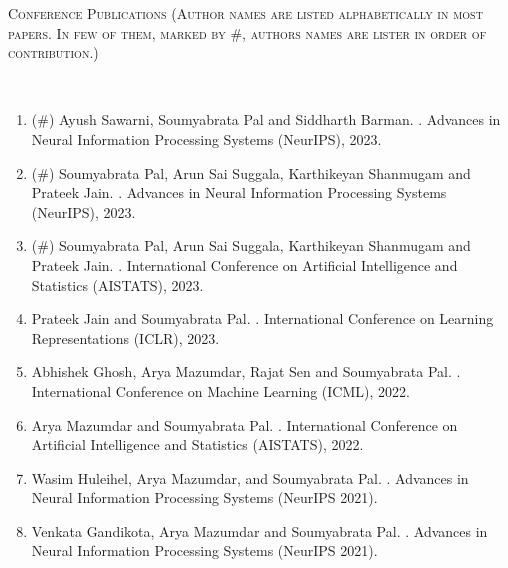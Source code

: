 \documentclass[9pt]{article}
\newenvironment{changemargin}[2]{%
  \begin{list}{}{%
    \setlength{\topsep}{0pt}%
    \setlength{\leftmargin}{0pt}%
    \setlength{\rightmargin}{#2}%
    \setlength{\listparindent}{\parindent}%
    \setlength{\itemindent}{\parindent}%
    \setlength{\parsep}{\parskip}%
  }%
  \item[]}{\end{list}
}
\newcommand{\lineover}{
	\begin{changemargin}{-0.05in}{-0.05in}
		\vspace*{-8pt}
		\hrulefill \\
		\vspace*{-2pt}
	\end{changemargin}
}
\newcommand{\header}[1]{
	\begin{changemargin}{-0.5in}{-0.5in}
		\scshape{#1}\\
  	\lineover
	\end{changemargin}
}
\begin{document}
\header{Conference Publications (Author names are listed alphabetically in most papers. In few of them, marked by \#, authors names are lister in order of contribution.)}
\begin{enumerate}

\item (\#) Ayush Sawarni, Soumyabrata Pal and Siddharth Barman. \href{}{}.
Advances in Neural Information Processing Systems (NeurIPS), 2023. 

\item (\#) Soumyabrata Pal, Arun Sai Suggala, Karthikeyan Shanmugam and Prateek Jain.
\href{}{}.
Advances in Neural Information Processing Systems (NeurIPS), 2023.


\item (\#)  Soumyabrata Pal, Arun Sai Suggala, Karthikeyan Shanmugam and Prateek Jain.
\href{https://arxiv.org/abs/2301.07040}{}.
International Conference on Artificial Intelligence and Statistics (AISTATS), 2023.

\item  Prateek Jain and Soumyabrata Pal.
\href{https://arxiv.org/abs/2209.03997}{}.
International Conference on Learning Representations (ICLR), 2023.

\item  Abhishek Ghosh, Arya Mazumdar, Rajat Sen and Soumyabrata Pal.
\href{https://arxiv.org/abs/2205.13166}{}. International Conference on Machine Learning (ICML), 2022.

\item Arya Mazumdar and Soumyabrata Pal. \href{https://arxiv.org/abs/2202.11940}{}. International Conference on Artificial Intelligence and Statistics (AISTATS), 2022.


\item Wasim Huleihel, Arya Mazumdar, and Soumyabrata Pal. \href{https://arxiv.org/abs/2106.02212}{}. Advances in Neural Information Processing Systems (NeurIPS 2021).

\item Venkata Gandikota, Arya Mazumdar and Soumyabrata Pal. \href{https://arxiv.org/abs/2106.05951}{}. Advances in Neural Information Processing Systems (NeurIPS 2021). 


\end{enumerate}
\end{document}
